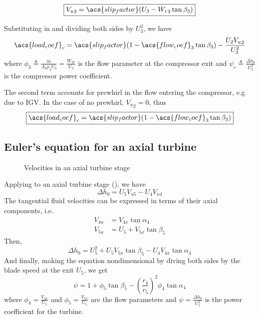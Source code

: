 \begin{equation}
    \label{eqn:V_u_3_corrected}
    \boxed{{V_u}_3 = \acs{slip_factor}(U_3 - {W_r}_3 \tan\beta_3)}
\end{equation}

Substituting  in  and dividing both sides by ${U_3^2}$, we have
\begin{equation}
    \acs{load_coef}_c = \acs{slip_factor}(1-\acs{flow_coef}_3\tan\beta_3) - \frac{U_2 {V_u}_2}{U_3^2} 
\end{equation}
where $\phi_3 \triangleq \frac{\dot{m}}{A_3 \rho_3 U_3} = \frac{W_{3r}}{U_3}$ is the flow parameter at the compressor exit
and $\psi_c \triangleq \frac{\Delta h_0}{U_3^2}$ is the compressor power coefficient.

The second term accounts for prewhirl in the flow entering the compressor, e.g due to \ac{IGV}.
In the case of no prewhirl, ${V_u}_2 = 0$, thus 
\begin{equation}
    \label{eqn:euler_compressor}
    \boxed{\acs{load_coef}_c = \acs{slip_factor}(1-\acs{flow_coef}_3\tan\beta_3)}
\end{equation}

\subsection{Euler's equation for an axial turbine}

\begin{figure}[bp]
    \caption{Velocities in an axial turbine stage}
    \label{fig:turbine_euler}
    
\end{figure}

Applying  to an axial turbine stage (), we have
\begin{equation}
    \Delta h_0 = U_5V_{u5}-U_4V_{u4}
\end{equation}
The tangential fluid velocities can be expressed in terms of their axial components, i.e.\
\begin{align}
    V_{4u} &= V_{4x} \tan\alpha_4 \\
    V_{5u} &= U_5 + V_{5x} \tan\beta_5
\end{align}
Then,
\begin{equation}
    \Delta h_0 = U_5^2 + U_5 V_{5x}\tan\beta_5 - U_4 V_{4x}\tan\alpha_4
\end{equation}
And finally, making the equation nondimensional by diving both sides by the blade speed at the exit $U_5$, we get
\begin{equation}
    \boxed{\psi = 1 + \phi_5\tan\beta_5-\left(\frac{r_4}{r_5}\right)^2\phi_4\tan\alpha_4}
\end{equation}
where $\phi_4 = \frac{V_{4x}}{U_5}$ and $\phi_5 = \frac{V_{5x}}{U_5}$ are the flow parameters and
$\psi=\frac{\Delta h_0}{U_5^2}$ is the power coefficient for the turbine.

